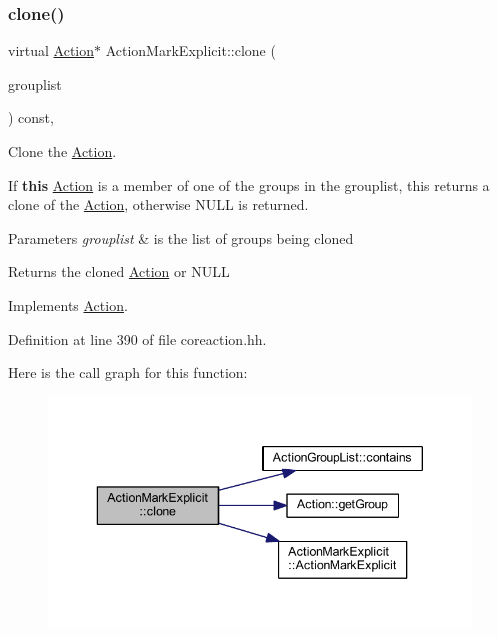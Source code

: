 \subsubsection{\texorpdfstring{clone()}{clone()}}
{\footnotesize\ttfamily virtual \mbox{\hyperlink{class_action}{Action}}$\ast$ Action\+Mark\+Explicit\+::clone (\begin{DoxyParamCaption}\item[{const \mbox{\hyperlink{class_action_group_list}{Action\+Group\+List}} \&}]{grouplist }\end{DoxyParamCaption}) const\hspace{0.3cm}{\ttfamily [inline]}, {\ttfamily [virtual]}}



Clone the \mbox{\hyperlink{class_action}{Action}}. 

If {\bfseries{this}} \mbox{\hyperlink{class_action}{Action}} is a member of one of the groups in the grouplist, this returns a clone of the \mbox{\hyperlink{class_action}{Action}}, otherwise N\+U\+LL is returned. 
\begin{DoxyParams}{Parameters}
{\em grouplist} & is the list of groups being cloned \\
\hline
\end{DoxyParams}
\begin{DoxyReturn}{Returns}
the cloned \mbox{\hyperlink{class_action}{Action}} or N\+U\+LL 
\end{DoxyReturn}


Implements \mbox{\hyperlink{class_action_af8242e41d09e5df52f97df9e65cc626f}{Action}}.



Definition at line 390 of file coreaction.\+hh.

Here is the call graph for this function\+:
\nopagebreak
\begin{figure}[H]
\begin{center}
\leavevmode
\includegraphics[width=343pt]{class_action_mark_explicit_a35862d8fd674fcf340ccf3bdd99a18e6_cgraph}
\end{center}
\end{figure}


